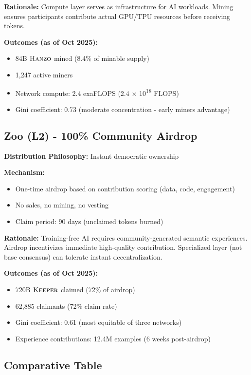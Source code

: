 \textbf{Rationale:} Compute layer serves as infrastructure for AI workloads. Mining ensures participants contribute actual GPU/TPU resources before receiving tokens.

\textbf{Outcomes (as of Oct 2025):}
\begin{itemize}
\item 84B $\textsc{Hanzo}$ mined (8.4\% of minable supply)
\item 1,247 active miners
\item Network compute: 2.4 exaFLOPS (2.4 × 10\textsuperscript{18} FLOPS)
\item Gini coefficient: 0.73 (moderate concentration - early miners advantage)
\end{itemize}

\subsection{Zoo (L2) - 100\% Community Airdrop}

\textbf{Distribution Philosophy:} Instant democratic ownership

\textbf{Mechanism:}
\begin{itemize}
\item One-time airdrop based on contribution scoring (data, code, engagement)
\item No sales, no mining, no vesting
\item Claim period: 90 days (unclaimed tokens burned)
\end{itemize}

\textbf{Rationale:} Training-free AI requires community-generated semantic experiences. Airdrop incentivizes immediate high-quality contribution. Specialized layer (not base consensus) can tolerate instant decentralization.

\textbf{Outcomes (as of Oct 2025):}
\begin{itemize}
\item 720B $\textsc{Keeper}$ claimed (72\% of airdrop)
\item 62,885 claimants (72\% claim rate)
\item Gini coefficient: 0.61 (most equitable of three networks)
\item Experience contributions: 12.4M examples (6 weeks post-airdrop)
\end{itemize}

\subsection{Comparative Table}


